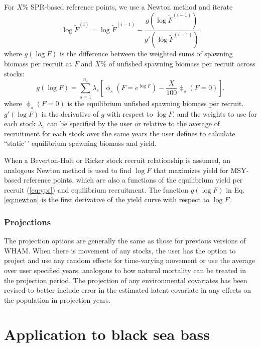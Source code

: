 \documentclass[
]{article}
\begin{document}
For \(X\%\) SPR-based reference points, we use a Newton method and
iterate \begin{equation}\label{eq:newton}
  \log\widetilde{F}^{(i)} = \log\widetilde{F}^{(i-1)} - \frac{g\left(\log\widetilde{F}^{(i-1)}\right)}{g'\left(\log\widetilde{F}^{(i-1)}\right)}
\end{equation} where \(g(\log F)\) is the difference between the
weighted sums of spawning biomass per recruit at \(F\) and \(X\)\% of
unfished spawning biomass per recruit across stocks: \begin{equation*}
  g(\log F) = \sum^{n_s}_{s=1} \lambda_s\left[\upphi_s\left(F = e^{\log F}\right) - \frac{X}{100}\upphi_s\left(F=0\right)\right].
\end{equation*} where \(\upphi_s\left(F=0\right)\) is the equilibrium
unfished spawning biomass per recruit. \(g'(\log F)\) is the derivative
of \(g\) with respect to \(\log F\), and the weights to use for each
stock \(\lambda_s\) can be specified by the user or relative to the
average of recruitment for each stock over the same years the user
defines to calculate ``static'\,' equilibrium spawning biomass and
yield.

When a Beverton-Holt or Ricker stock recruit relationship is assumed, an
analogous Newton method is used to find \(\log F\) that maximizes yield
for MSY-based reference points. which are also a functions of the
equilibrium yield per recruit (\ref{eq:ypr}) and equilibrium
recruitment. The function \(g(\log F)\) in Eq. \ref{eq:newton} is the
first derivative of the yield curve with respect to \(\log F\).

\hypertarget{projections}{%
\subsubsection*{Projections}\label{projections}}

The projection options are generally the same as those for previous
versions of WHAM. When there is movement of any stocks, the user has the
option to project and use any random effects for time-varying movement
or use the average over user specified years, analogous to how natural
mortality can be treated in the projection period. The projection of any
environmental covariates has been revised to better include error in the
estimated latent covariate in any effects on the population in
projection years.

\hypertarget{application-to-black-sea-bass}{%
\section*{Application to black sea
bass}\label{application-to-black-sea-bass}}
\end{document}
